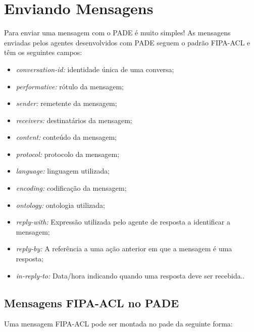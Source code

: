 \documentclass[letterpaper,10pt,brazil]{sphinxmanual}
\begin{document}
\section{Enviando Mensagens}
\label{user/enviando-mensagens:enviando-mensagens}\label{user/enviando-mensagens::doc}
Para enviar uma mensagem com o PADE é muito simples! As mensagens enviadas pelos agentes desenvolvidos com PADE seguem o padrão FIPA-ACL e têm os seguintes campos:
\begin{itemize}
\item {} 
\emph{conversation-id:} identidade única de uma conversa;

\item {} 
\emph{performative:} rótulo da mensagem;

\item {} 
\emph{sender:} remetente da mensagem;

\item {} 
\emph{receivers:} destinatários da mensagem;

\item {} 
\emph{content:} conteúdo da mensagem;

\item {} 
\emph{protocol:} protocolo da mensagem;

\item {} 
\emph{language:} linguagem utilizada;

\item {} 
\emph{encoding:} codificação da mensagem;

\item {} 
\emph{ontology:} ontologia utilizada;

\item {} 
\emph{reply-with:} Expressão utilizada pelo agente de resposta a identificar a mensagem;

\item {} 
\emph{reply-by:} A referência a uma ação anterior em que a mensagem é uma resposta;

\item {} 
\emph{in-reply-to:} Data/hora indicando quando uma resposta deve ser recebida..

\end{itemize}


\subsection{Mensagens FIPA-ACL no PADE}
\label{user/enviando-mensagens:mensagens-fipa-acl-no-pade}
Uma mensagem FIPA-ACL pode ser montada no pade da seguinte forma:
\end{document}
